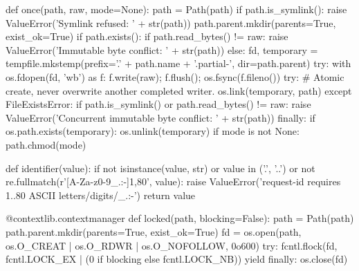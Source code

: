 def once(path, raw, mode=None):
    path = Path(path)
    if path.is_symlink():
        raise ValueError('Symlink refused: ' + str(path))
    path.parent.mkdir(parents=True, exist_ok=True)
    if path.exists():
        if path.read_bytes() != raw:
            raise ValueError('Immutable byte conflict: ' + str(path))
    else:
        fd, temporary = tempfile.mkstemp(prefix='.' + path.name + '.partial-', dir=path.parent)
        try:
            with os.fdopen(fd, 'wb') as f:
                f.write(raw); f.flush(); os.fsync(f.fileno())
            try:
                # Atomic create, never overwrite another completed writer.
                os.link(temporary, path)
            except FileExistsError:
                if path.is_symlink() or path.read_bytes() != raw:
                    raise ValueError('Concurrent immutable byte conflict: ' + str(path))
        finally:
            if os.path.exists(temporary):
                os.unlink(temporary)
    if mode is not None:
        path.chmod(mode)


def identifier(value):
    if not isinstance(value, str) or value in ('.', '..') or not re.fullmatch(r'[A-Za-z0-9_.:-]{1,80}', value):
        raise ValueError('request-id requires 1..80 ASCII letters/digits/_.:-')
    return value


@contextlib.contextmanager
def locked(path, blocking=False):
    path = Path(path)
    path.parent.mkdir(parents=True, exist_ok=True)
    fd = os.open(path, os.O_CREAT | os.O_RDWR | os.O_NOFOLLOW, 0o600)
    try:
        fcntl.flock(fd, fcntl.LOCK_EX | (0 if blocking else fcntl.LOCK_NB))
        yield
    finally:
        os.close(fd)


